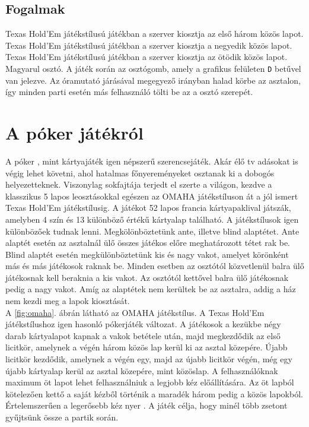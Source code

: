 \subsection{Fogalmak}
Texas Hold'Em játékstílusú játékban a szerver kiosztja az első három közös lapot.
Texas Hold'Em játékstílusú játékban a szerver kiosztja a negyedik közös lapot.
Texas Hold'Em játékstílusú játékban a szerver kiosztja az ötödik közös lapot.
Magyarul osztó. A játék során az osztógomb, amely a grafikus felületen \texttt{D} betűvel van jelezve. Az óramutató járásával megegyező irányban halad körbe az asztalon, így minden parti esetén más felhasználó tölti be az a osztó szerepét.

\section{A póker játékról}
A póker \cite{poker_game}, mint kártyajáték igen népszerű szerencsejáték. Akár élő tv adásokat is végig lehet követni, ahol hatalmas főnyereményeket osztanak ki a dobogós helyezetteknek. Viszonylag sokfajtája terjedt el szerte a világon, kezdve a klasszikus 5 lapos leosztásokkal egészen az OMAHA játékstíluson át a jól ismert Texas Hold'Em játékstílusig. A játékot 52 lapos francia kártyapaklival játszák, amelyben 4 szín és 13 különböző értékű kártyalap található. A játékstílusok igen különbözőek tudnak lenni. Megkölönböztetünk ante, illetve blind alaptétet. Ante alaptét esetén az asztalnál ülő összes játékos előre meghatározott tétet rak be. Blind alaptét esetén megkülönböztetünk kis és nagy vakot, amelyet körönként más és más játékosok raknak be. Minden esetben az osztótól közvetlenül balra ülő játékosnak kell beraknia a kis vakot. Az osztótól kettővel balra ülő játékosnak pedig a nagy vakot. Amíg az alaptétek nem kerültek be az asztalra, addig a ház nem kezdi meg a lapok kiosztását. \\
A \ref{fig:omaha}. ábrán látható az OMAHA \cite{omaha_poker} játékstílus. A Texas Hold'Em játékstílushoz igen hasonló pókerjáték változat. A játékosok a kezükbe négy darab kártyalapot kapnak a vakok betétele után, majd megkezdődik az első licitkör, amelynek a végén három közös lap kerül ki az asztal közepére. Újabb licitkör kezdődik, amelynek a végén egy, majd az újabb licitkör végén, még egy újabb kártyalap kerül az asztal közepére, mint közöslap. A felhasználóknak maximum öt lapot lehet felhasználniuk a legjobb kéz előállítására. Az öt lapból kötelezően kettő a saját kézből történik a maradék három pedig a közös lapokból. Értelemszerűen a legerősebb kéz nyer \cite{card_combinations}. A játék célja, hogy minél több zsetont gyűjtsünk össze a partik során.
